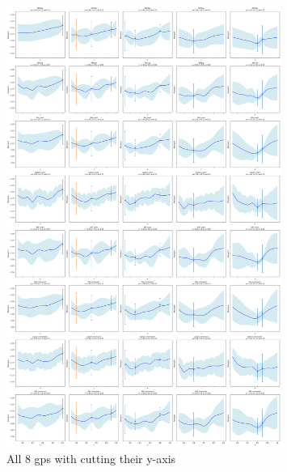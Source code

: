 \documentclass[12pt]{article}
\begin{document}
\begin{figure}[H]
    \centering
    \includegraphics[width=0.8\textwidth]{LatexPlots/final_gps_plots/final_gps_ycuts.png}
    \caption{All 8 gps with cutting their y-axis}
    \label{fig:best8_ycuts}
\end{figure}
\end{document}
